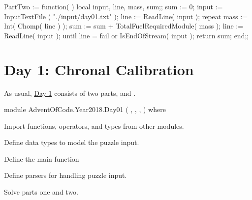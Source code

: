 \nwendcode{}\nwdocspar

\nwenddocs{}\plusendmoddef\nwstartdeflinemarkup{}\nwenddeflinemarkup
PartTwo := function( )
    local input, line, mass, sum;;
    sum := 0;
    input := InputTextFile ( "./input/day01.txt" );
    line := ReadLine( input );
    repeat
        mass := Int( Chomp( line ) );
        sum := sum + TotalFuelRequiredModule( mass );
        line := ReadLine( input );
    until line = fail or IsEndOfStream( input );
    return sum;
end;;
\nwendcode{}\nwdocspar
\nwenddocs{}\chapter{Day 1: Chronal Calibration}

As usual, \href{https://adventofcode.com/2018/1}{Day 1} consists of two parts,
{\Tt{}\nwendquote} and {\Tt{}\nwendquote}.

\nwenddocs{}\endmoddef\nwstartdeflinemarkup\nwenddeflinemarkup
module AdventOfCode.Year2018.Day01
  ( ,
    ,
    ,
  )
where

\LA{}Import functions, operators, and types from other modules.~{\nwtagstyle{}}\RA{}

\LA{}Define data types to model the puzzle input.~{\nwtagstyle{}}\RA{}

\LA{}Define the main function~{\nwtagstyle{}}\RA{}

\LA{}Define parsers for handling puzzle input.~{\nwtagstyle{}}\RA{}

\LA{}Solve parts one and two.~{\nwtagstyle{}}\RA{}
\nwendcode{}\nwdocspar

